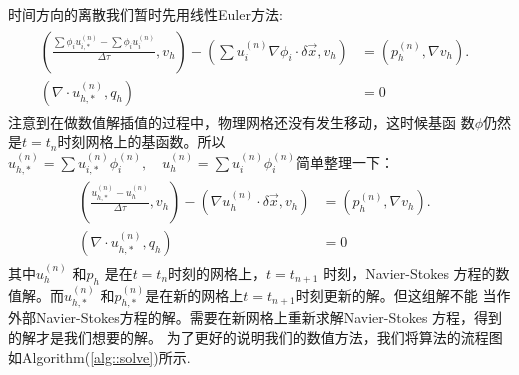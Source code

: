     时间方向的离散我们暂时先用线性Euler方法:
    \begin{eqnarray}
      \begin{aligned}
        \left ( \frac{\sum \phi_i u_{i, *}^{(n)} - \sum \phi_i
            u_i^{(n)}}{\Delta \tau}, v_h \right) - \left ( \sum
          u_i^{(n)} \nabla \phi_i \cdot \delta \vec{x}, v_h \right) &
        = \left( p_h^{(n)},  \nabla v_h \right).& \\
        \left( \nabla \cdot u_{h, *}^{(n)}, q_h \right) & = 0 &
      \end{aligned}
    \end{eqnarray}
    注意到在做数值解插值的过程中，物理网格还没有发生移动，这时候基函
    数$\phi$仍然是$t = t_n$时刻网格上的基函数。所以$u_{h,*}^{(n)} = \sum
    u_{i, *}^{(n)} \phi_i^{(n)}, \quad u_h^{(n)} = \sum u_i^{(n)}
      \phi_i^{(n)}$简单整理一下：
    \begin{eqnarray}
      \begin{aligned}
        \left ( \frac{u_{h, *}^{(n)} - u_h^{(n)}}{\Delta \tau}, v_h
        \right) - \left (\nabla u_h^{(n)} \cdot \delta \vec{x}, v_h
        \right) & = \left( p_h^{(n)}, \nabla v_h \right).& \\
        \left( \nabla \cdot u_{h, *}^{(n)}, q_h \right) & = 0 &
      \end{aligned}
    \end{eqnarray}
    其中$u_h^{(n)}$ 和$p_h$ 是在$t = t_n$时刻的网格上，$t = t_{n + 1}$
    时刻，Navier-Stokes 方程的数值解。而$u_{h, *}^{(n)}$ 和$p_{h,
      *}^{(n)}$是在新的网格上$t = t_{n + 1}$时刻更新的解。但这组解不能
    当作外部Navier-Stokes方程的解。需要在新网格上重新求解Navier-Stokes
    方程，得到的解才是我们想要的解。
   为了更好的说明我们的数值方法，我们将算法的流程图如Algorithm(\ref{alg::solve})所示.
